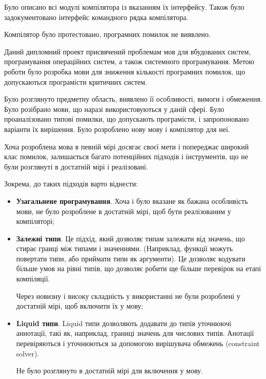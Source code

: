 \documentclass[main.tex]{subfiles}
\begin{document}
Було описано всі модулі компілятора із вказанням їх інтерфейсу.
Також було задокументовано інтерфейс командного рядка компілятора.

Компілятор було протестовано, програмних помилок не виявлено.


Даний дипломний проект присвячений проблемам мов для вбудованих систем, програмування операційних систем, а також системного програмування.
Метою роботи було розробка мови для зниження кількості програмних помилок, що допускаються програмісти критичних систем.

Було розглянуто предметну область, виявлено її особливості, вимоги і обмеження.
Було розібрано мови, що наразі використовуються у даній сфері.
Було проаналізовано типові помилки, що допускають програмісти, і запропоновано варіанти їх вирішення.
Було розроблено нову мову і компілятор для неї.

Хоча розроблена мова в певній мірі досягає своєї мети і попереджає широкий клас помилок, залишається багато потенційних підходів і інструментів, що не були розглянуті в достатній мірі і реалізовані.

Зокрема, до таких підходів варто віднести:
\begin{itemize}
\item \textbf{Узагальнене програмування}.
  Хоча і було вказане як бажана особливість мови, не було розроблене в достатній мірі, щоб бути реалізованим у компіляторі;
\item \textbf{Залежні типи}.
  Це підхід, який дозволяє типам залежати від значень, що стирає граиці між типами і значеннями.
  (Наприклад, функції можуть повертати типи, або приймати типи як аргументи).
  Це дозволяє кодувати більше умов на рівні типів, що дозволяє робити ще більше перевірок на етапі компіляції.

  Через новизну і високу складність у використанні не були розроблені у достатній мірі, щоб включити їх у мову;
\item \textbf{Liquid типи}.
  Liquid типи дозволяють додавати до типів уточнюючі аннотації, такі як, наприклад, границі значень для числових типів.
  Анотації перевіряються і уточнюються за допомогою вирішувача обмежень (constraint solver).

  Не було розглянуто в достатній мірі для включення у мову.
\end{itemize}
\end{document}
